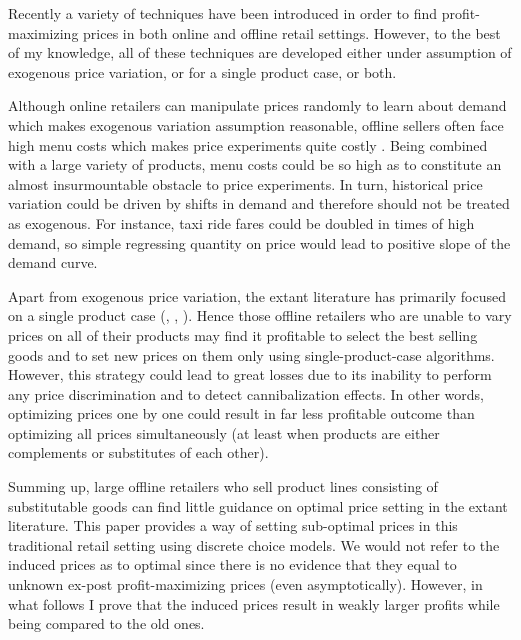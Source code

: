 \documentclass[12pt]{article}
\begin{document}
Recently a variety of techniques have been introduced in order to find profit-maximizing prices in both online and offline retail settings.
However, to the best of my knowledge, all of these techniques are developed either under assumption of exogenous price variation, or for a single product case, or both.

\par Although online retailers can manipulate prices randomly to learn about demand which makes exogenous variation assumption reasonable, offline sellers often face high menu costs which makes price experiments quite costly \cite{anderson2015price}.
Being combined with a large variety of products, menu costs could be so high as to constitute an almost insurmountable obstacle to price experiments. In turn, historical price variation could be driven by shifts in demand and therefore should not be treated as exogenous.
For instance, taxi ride fares could be doubled in times of high demand, so simple regressing quantity on price would lead to positive slope of the demand curve.

\par Apart from exogenous price variation, the extant literature has primarily focused on a single product case (\cite{handel2015robust}, \cite{dube2017scalable}, \cite{misra2018dynamic}).
Hence those offline retailers who are unable to vary prices on all of their products may find it profitable to select the best selling goods and to set new prices on them only using single-product-case algorithms.
However, this strategy could lead to great losses due to its inability to perform any price discrimination and to detect cannibalization effects.
In other words, optimizing prices one by one could result in far less profitable outcome than optimizing all prices simultaneously (at least when products are either complements or substitutes of each other).

\par Summing up, large offline retailers who sell product lines consisting of substitutable goods can find little guidance on optimal price setting in the extant literature.
This paper provides a way of setting sub-optimal prices in this traditional retail setting using discrete choice models.
We would not refer to the induced prices as to optimal since there is no evidence that they equal to unknown ex-post profit-maximizing prices (even asymptotically).
However, in what follows I prove that the induced prices result in weakly larger profits while being compared to the old ones.
\end{document}
